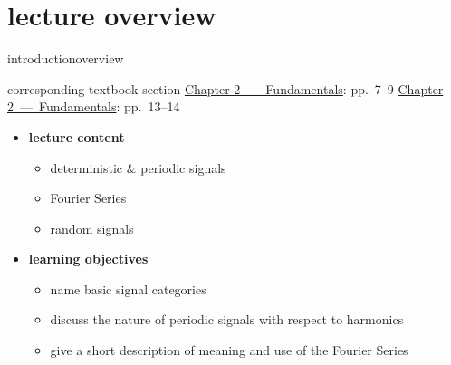 




\subtitle{Module 2.0: Fundamentals~---~Signals}


	

    \section[overview]{lecture overview}
        \begin{frame}{introduction}{overview}
            \begin{block}{corresponding textbook section}
                    \href{http://ieeexplore.ieee.org/xpl/articleDetails.jsp?tp=&arnumber=6331119&}{Chapter 2~---~Fundamentals}: pp.~7--9
                    \href{http://ieeexplore.ieee.org/xpl/articleDetails.jsp?tp=&arnumber=6331119&}{Chapter 2~---~Fundamentals}: pp.~13--14
            \end{block}

            \begin{itemize}
                \item   \textbf{lecture content}
                    \begin{itemize}
                        \item   deterministic \& periodic signals
                        \item   Fourier Series
                        \item   random signals
                    \end{itemize}
                \bigskip
                \item<2->   \textbf{learning objectives}
                    \begin{itemize}
                        \item   name basic signal categories
                        \item   discuss the nature of periodic signals with respect to harmonics
                        \item   give a short description of meaning and use of the Fourier Series
                    \end{itemize}
            \end{itemize}
        \end{frame}
        
